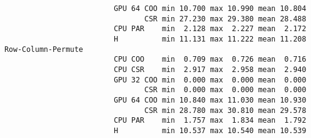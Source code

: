 \begin{verbatim}
                          GPU 64 COO min 10.700 max 10.990 mean 10.804
                                 CSR min 27.230 max 29.380 mean 28.488
                          CPU PAR    min  2.128 max  2.227 mean  2.172
                          H          min 11.131 max 11.222 mean 11.208
 Row-Column-Permute
                          CPU COO    min  0.709 max  0.726 mean  0.716
                          CPU CSR    min  2.917 max  2.958 mean  2.940
                          GPU 32 COO min  0.000 max  0.000 mean  0.000
                                 CSR min  0.000 max  0.000 mean  0.000
                          GPU 64 COO min 10.840 max 11.030 mean 10.930
                                 CSR min 28.780 max 30.810 mean 29.578
                          CPU PAR    min  1.757 max  1.834 mean  1.792
                          H          min 10.537 max 10.540 mean 10.539
\end{verbatim}
